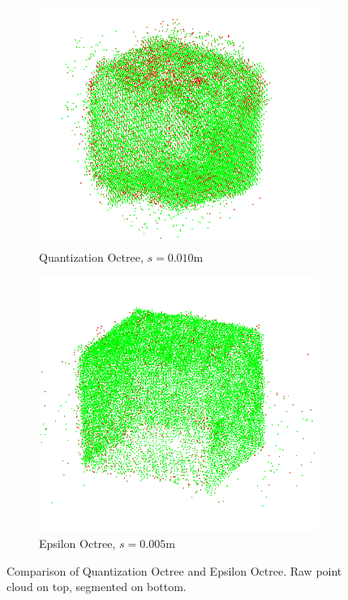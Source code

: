\begin{figure}[h!tp]
    \begin{subfigure}[b]{0.4\textwidth}
        \centering
        \includegraphics[width=0.9\linewidth]{images/eval-clouds-quant-segmented2}
        \caption{Quantization Octree, $s=0.010$m}
    \end{subfigure}%
    \begin{subfigure}[b]{0.4\textwidth}
        \centering
        \includegraphics[width=0.9\linewidth]{images/eval-clouds-epsilon-segmented}
        \caption{Epsilon Octree, $s=0.005$m}
        \label{fig:octrees-compairison-epsilon}
    \end{subfigure}%

    \caption{Comparison of Quantization Octree and Epsilon Octree. Raw point cloud on top, segmented on bottom.}
    \label{fig:octrees-compairison}
\end{figure}

